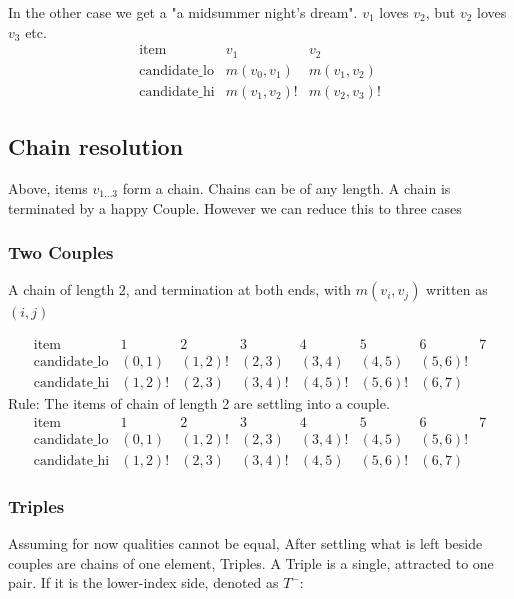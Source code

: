 \documentclass{article}
\theoremstyle{plain}
\begin{document}
In the other case we get a "a midsummer night's dream".
$v_1$ loves $v_2$, but $v_2$ loves $v_3$ etc. 
\[
\begin{array}{c|cc}
\text{item}  & v_1 & v_2 \\
\hline
\text{candidate\_lo} & m(v_0, v_1) & m(v_1, v_2) \\
\text{candidate\_hi} & m(v_1, v_2)! & m(v_2, v_3)! 
\end{array}
\]

\subsection*{Chain resolution}

Above, items $v_{1 ... 3} $ form a chain.  Chains can be of any length. 
A chain is terminated by a happy Couple.
However we can reduce this to three cases

\subsubsection{Two Couples}
A chain of length 2, and termination at both ends, with $m(v_i, v_j)$ written as $(i,j)$

\[
\begin{array}{c|ccccccc}
\text{item}  & 1 & 2 & 3 & 4 & 5 & 6&7\\
\hline
\text{candidate\_lo} & (0, 1) & (1, 2)! & (2, 3) & (3, 4)  & (4, 5) & (5, 6)!\\
\text{candidate\_hi} & (1, 2)! & (2, 3) & (3, 4)! & (4, 5)!  & (5, 6)! & (6, 7)
\end{array}
\]
Rule: The items of chain of length 2 are settling into a couple.
\[
\begin{array}{c|ccccccc}
\text{item}  & 1 & 2 & 3 & 4 & 5 & 6&7\\
\hline
\text{candidate\_lo} & (0, 1) & (1, 2)! & (2, 3) & (3, 4)!  & (4, 5) & (5, 6)!\\
\text{candidate\_hi} & (1, 2)! & (2, 3) & (3, 4)! & (4, 5)  & (5, 6)! & (6, 7)
\end{array}
\]

\subsubsection{Triples}
Assuming for now qualities cannot be equal,
After settling what is left beside couples are
chains of one element, Triples. 
A Triple is a single, attracted to one pair. 
If it is the lower-index side, denoted as $T^{-}$:
\end{document}
